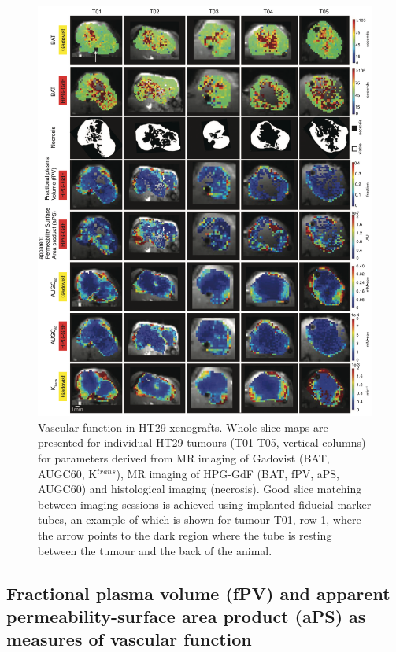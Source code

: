 \begin{figure}[htbp]
 \begin{center}
 \includegraphics[width=\textwidth]{hpg/hpg-paper1-images/hpg_fig4-ht29.png}
 \caption{Vascular function in HT29 xenografts. Whole-slice maps are presented for individual HT29 tumours (T01-T05, vertical columns) for parameters derived from MR imaging of Gadovist (BAT, AUGC60, K$^{trans}$), MR imaging of \acs{HPG-GdF} (\acs{BAT}, \acs{fPV}, \acs{aPS}, AUGC60) and histological imaging (necrosis). Good slice matching between imaging sessions is achieved using implanted fiducial marker tubes, an example of which is shown for tumour T01, row 1, where the arrow points to the dark region where the tube is resting between the tumour and the back of the animal.}
 \label{hpgpaper1:fig4}
 \end{center}
\end{figure}

\subsection{Fractional plasma volume (\acs{fPV}) and apparent permeability-surface area product (\acs{aPS}) as measures of vascular function}

